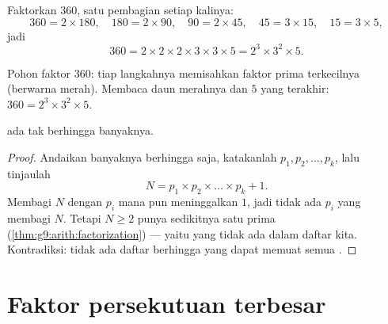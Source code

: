 \begin{example}\label{ex:g9:arith:factorization}
Faktorkan $360$, satu pembagian setiap kalinya:
\[
360 = 2 \times 180, \quad
180 = 2 \times 90, \quad
90 = 2 \times 45, \quad
45 = 3 \times 15, \quad
15 = 3 \times 5,
\]
jadi
\[
360 = 2 \times 2 \times 2 \times 3 \times 3 \times 5 = 2^3 \times 3^2
\times 5 .
\]
\end{example}

\begin{omfigure}

{\small Pohon faktor $360$: tiap langkahnya memisahkan faktor prima
terkecilnya (berwarna merah). Membaca daun merahnya dan $5$ yang
terakhir: $360 = 2^3 \times 3^2 \times 5$.}
\end{omfigure}

\begin{theorem}[Euclid]\label{thm:g9:arith:euclid}
 ada tak berhingga banyaknya.
\end{theorem}

\begin{proof}
Andaikan banyaknya berhingga saja, katakanlah $p_1, p_2, \dots, p_k$,
lalu tinjaulah
\[
N = p_1 \times p_2 \times \dots \times p_k + 1 .
\]
Membagi $N$ dengan $p_i$ mana pun meninggalkan  $1$, jadi tidak
ada $p_i$ yang membagi $N$. Tetapi $N \geq 2$ punya sedikitnya satu
 prima (\cref{thm:g9:arith:factorization}) --- yaitu  yang tidak ada dalam daftar kita. Kontradiksi: tidak ada daftar
berhingga yang dapat memuat semua .
\end{proof}

\section{Faktor persekutuan terbesar}

